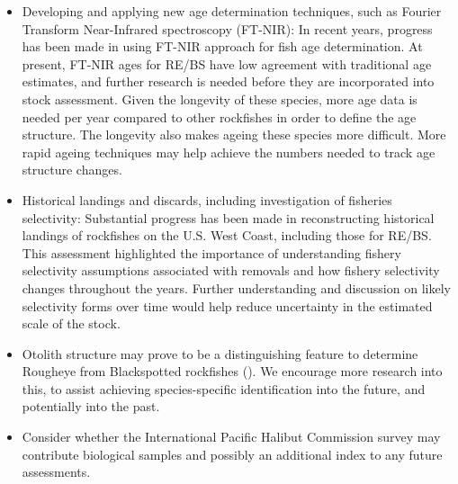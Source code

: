 \documentclass[
]{article}
\begin{document}
\begin{itemize}
  This will include the consideration of improving the ageing error of
  these species, with a consideration towards decreasing the number of
  ageing error matrices needed, or improving the imprecision of some of
  the current ageing error matrices. This would necessitate the
  re-reading of otoliths (in addition to reading new otoliths).
\item
  Developing and applying new age determination techniques, such as
  Fourier Transform Near-Infrared spectroscopy (FT-NIR): In recent
  years, progress has been made in using FT-NIR approach for fish age
  determination. At present, FT-NIR ages for RE/BS have low agreement
  with traditional age estimates, and further research is needed before
  they are incorporated into stock assessment. Given the longevity of
  these species, more age data is needed per year compared to other
  rockfishes in order to define the age structure. The longevity also
  makes ageing these species more difficult. More rapid ageing
  techniques may help achieve the numbers needed to track age structure
  changes.
\item
  Historical landings and discards, including investigation of fisheries
  selectivity: Substantial progress has been made in reconstructing
  historical landings of rockfishes on the U.S. West Coast, including
  those for RE/BS. This assessment highlighted the importance of
  understanding fishery selectivity assumptions associated with removals
  and how fishery selectivity changes throughout the years. Further
  understanding and discussion on likely selectivity forms over time
  would help reduce uncertainty in the estimated scale of the stock.
\item
  Otolith structure may prove to be a distinguishing feature to
  determine Rougheye from Blackspotted rockfishes
  (). We encourage
  more research into this, to assist achieving species-specific
  identification into the future, and potentially into the past.
\item
  Consider whether the International Pacific Halibut Commission survey
  may contribute biological samples and possibly an additional index to
  any future assessments.
\end{itemize}
\end{document}
